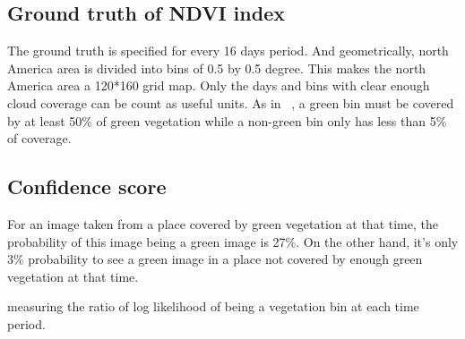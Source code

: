 \documentclass[10pt,twocolumn,letterpaper]{article}
\begin{document}
\subsection{Ground truth of NDVI index}
The ground truth is specified for every 16 days period. 
And geometrically, north America area is divided into bins of 0.5 by 0.5 degree. This makes the north America area a 120*160 grid map.
Only the days and bins with clear enough cloud coverage can be count as useful units. As in ~\cite{www paper}, a green bin must be covered by at least 50\% of green vegetation while a non-green bin only has less than 5\% of coverage.







\subsection{Confidence score}


For an image taken from a place covered by green vegetation at that time, the probability of this image being a green image is 27\%. On the other hand, it's only 3\% probability to see a green image in a place not covered by enough green vegetation at that time.

measuring the ratio of log likelihood of being a vegetation bin at each time period.
\end{document}
